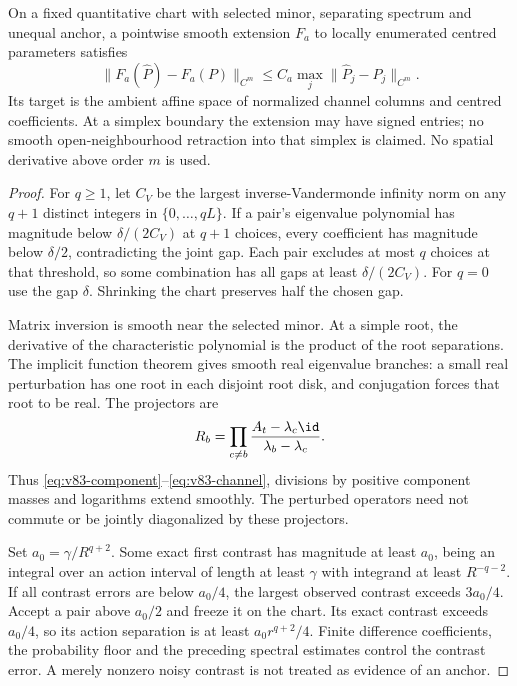 \begin{lemma}\label{lem:v83-local}
On a fixed quantitative chart with selected minor, separating spectrum
and unequal anchor, a pointwise smooth extension $F_a$ to locally
enumerated centred parameters satisfies
\begin{equation}\label{eq:v83-local-estimate}
 \|F_a(\widehat P)-F_a(P)\|_{C^m}
       \le C_a\max_j\|\widehat P_j-P_j\|_{C^m}.
\end{equation}
Its target is the ambient affine space of normalized channel columns
and centred coefficients. At a simplex boundary the extension may have
signed entries; no smooth open-neighbourhood retraction into that
simplex is claimed. No spatial derivative above order $m$ is used.
\end{lemma}
\begin{proof}
For $q\ge1$, let $C_V$ be the largest inverse-Vandermonde infinity
norm on any $q+1$ distinct integers in $\{0,\ldots,qL\}$. If a
pair's eigenvalue polynomial has magnitude below $\delta/(2C_V)$ at
$q+1$ choices, every coefficient has magnitude below $\delta/2$,
contradicting the joint gap. Each pair excludes at most $q$ choices
at that threshold, so some combination has all gaps at least
$\delta/(2C_V)$. For $q=0$ use the gap $\delta$. Shrinking the chart
preserves half the chosen gap.

Matrix inversion is smooth near the selected minor. At a simple root,
the derivative of the characteristic polynomial is the product of the
root separations. The implicit function theorem gives smooth real
eigenvalue branches: a small real perturbation has one root in each
disjoint root disk, and conjugation forces that root to be real.
The projectors are
\[
 R_b=\prod_{c\ne b}\frac{A_t-\lambda_c\id}{\lambda_b-\lambda_c}.
\]
Thus \eqref{eq:v83-component}--\eqref{eq:v83-channel}, divisions by
positive component masses and logarithms extend smoothly. The
perturbed operators need not commute or be jointly diagonalized by
these projectors.

Set $a_0=\gamma/R^{q+2}$. Some exact first contrast has magnitude at
least $a_0$, being an integral over an action interval of length at
least $\gamma$ with integrand at least $R^{-q-2}$. If all contrast
errors are below $a_0/4$, the largest observed contrast exceeds
$3a_0/4$. Accept a pair above $a_0/2$ and freeze it on the chart.
Its exact contrast exceeds $a_0/4$, so its action separation is at
least $a_0r^{q+2}/4$. Finite difference coefficients, the probability
floor and the preceding spectral estimates control the contrast
error. A merely nonzero noisy contrast is not treated as evidence of
an anchor.


\end{proof}
